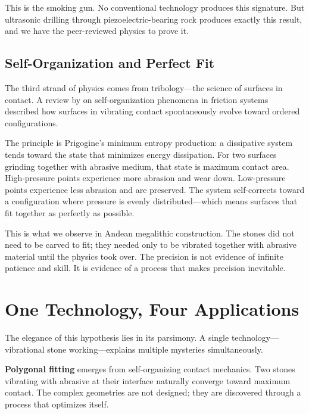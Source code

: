 \documentclass[11pt]{article}
\begin{document}
This is the smoking gun. No conventional technology produces this signature. But ultrasonic drilling through piezoelectric-bearing rock produces exactly this result, and we have the peer-reviewed physics to prove it.

\subsection{Self-Organization and Perfect Fit}

The third strand of physics comes from tribology---the science of surfaces in contact. A review by \citet{Assenova2022} on self-organization phenomena in friction systems described how surfaces in vibrating contact spontaneously evolve toward ordered configurations.

The principle is Prigogine's minimum entropy production: a dissipative system tends toward the state that minimizes energy dissipation. For two surfaces grinding together with abrasive medium, that state is maximum contact area. High-pressure points experience more abrasion and wear down. Low-pressure points experience less abrasion and are preserved. The system self-corrects toward a configuration where pressure is evenly distributed---which means surfaces that fit together as perfectly as possible.

This is what we observe in Andean megalithic construction. The stones did not need to be carved to fit; they needed only to be vibrated together with abrasive material until the physics took over. The precision is not evidence of infinite patience and skill. It is evidence of a process that makes precision inevitable.

\section{One Technology, Four Applications}

The elegance of this hypothesis lies in its parsimony. A single technology---vibrational stone working---explains multiple mysteries simultaneously.

\textbf{Polygonal fitting} emerges from self-organizing contact mechanics. Two stones vibrating with abrasive at their interface naturally converge toward maximum contact. The complex geometries are not designed; they are discovered through a process that optimizes itself.
\end{document}
